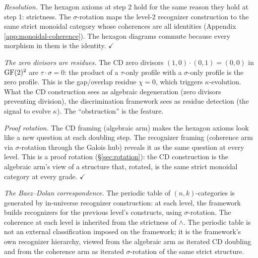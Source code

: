 \emph{Resolution.}
The hexagon axioms at step 2 hold for the same reason
they hold at step 1: strictness. The $\sigma$-rotation
maps the level-2 recognizer construction to the same
strict monoidal category whose coherences are all
identities (Appendix \ref{app:monoidal-coherence}).
The hexagon diagrams commute because every morphism in
them is the identity. $\checkmark$

\emph{The zero divisors are residues.}
The CD zero divisors $(1,0) \cdot (0,1) = (0,0)$ in
$\operatorname{GF}(2)^2$ are $\tau \cdot \sigma = 0$: the product
of a $\tau$-only profile with a $\sigma$-only profile
is the zero profile. This is the gap/overlap residue
$\chi = 0$, which triggers $\kappa$-evolution. What
the CD construction sees as algebraic degeneration
(zero divisors preventing division), the discrimination
framework sees as residue detection (the signal to
evolve $\kappa$). The ``obstruction'' is the feature.

\emph{Proof rotation.}
The CD framing (algebraic arm) makes the hexagon axioms
look like a new question at each doubling step. The
recognizer framing (coherence arm via $\sigma$-rotation
through the Galois hub) reveals it as the same
question at every level. This is a proof rotation
(\S\ref{sec:rotation}): the CD construction is the
algebraic arm's view of a structure that, rotated,
is the same strict monoidal category at every grade.
$\checkmark$

\emph{The Baez--Dolan correspondence.}
The periodic table of $(n,k)$-categories is generated by
in-universe recognizer construction: at each level, the
framework builds recognizers for the previous level's
constructs, using $\sigma$-rotation. The coherence at
each level is inherited from the strictness of $\wedge$.
The periodic table is not an external classification
imposed on the framework; it is the framework's own
recognizer hierarchy, viewed from the algebraic arm as
iterated CD doubling and from the coherence arm as
iterated $\sigma$-rotation of the same strict structure.

